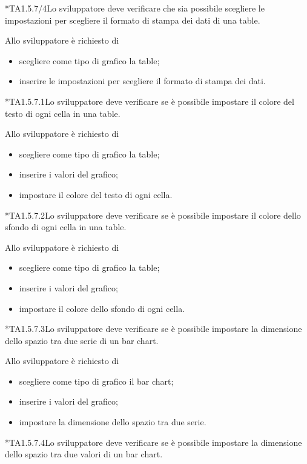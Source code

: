 	*{TA1.5.7/4}Lo sviluppatore deve verificare che sia possibile scegliere le impostazioni per scegliere il formato di stampa dei dati di una table.

		Allo sviluppatore è richiesto di
		\begin{itemize}
			\item scegliere come tipo di grafico la table;
			\item inserire le impostazioni per scegliere il formato di stampa dei dati.
		\end{itemize}

	*{TA1.5.7.1}Lo sviluppatore deve verificare se è possibile impostare il colore del testo di ogni cella in una table.

		Allo sviluppatore è richiesto di
		\begin{itemize}
			\item scegliere come tipo di grafico la table;
			\item inserire i valori del grafico;
			\item impostare il colore del testo di ogni cella.
		\end{itemize}

	*{TA1.5.7.2}Lo sviluppatore deve verificare se è possibile impostare il colore dello sfondo di ogni cella in una table.

		Allo sviluppatore è richiesto di
		\begin{itemize}
			\item scegliere come tipo di grafico la table;
			\item inserire i valori del grafico;
			\item impostare il colore dello sfondo di ogni cella.
		\end{itemize}

	*{TA1.5.7.3}Lo sviluppatore deve verificare se è possibile impostare la dimensione dello spazio tra due serie di un bar chart.

		Allo sviluppatore è richiesto di
		\begin{itemize}
			\item scegliere come tipo di grafico il bar chart;
			\item inserire i valori del grafico;
			\item impostare la dimensione dello spazio tra due serie.
		\end{itemize}

	*{TA1.5.7.4}Lo sviluppatore deve verificare se è possibile impostare la dimensione dello spazio tra due valori di un bar chart.

